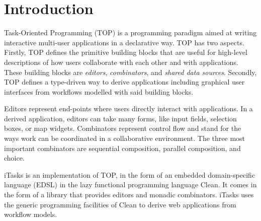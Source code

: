 
\section{Introduction}

Task-Oriented Programming (TOP) is a programming paradigm aimed at writing interactive multi-user applications in a declarative way.
TOP has two aspects.
Firstly, TOP defines the primitive building blocks that are useful for high-level descriptions of how users collaborate with each other and with applications.
These building blocks are \emph{editors}, \emph{combinators}, and \emph{shared data sources}.
Secondly, TOP defines a type-driven way to derive applications including graphical user interfaces from workflows modelled with said building blocks.

Editors represent end-points where users directly interact with applications.
In a derived application, editors can take many forms, like input fields, selection boxes, or map widgets.
Combinators represent control flow and stand for the ways work can be coordinated in a collaborative environment.
The three most important combinators are sequential composition, parallel composition, and choice.

iTasks is an implementation of TOP, in the form of an embedded domain-specific language (EDSL) in the lazy functional programming language Clean.
It comes in the form of a library that provides editors and monadic combinators.
iTasks uses the generic programming facilities of Clean to derive web applications from workflow models.
